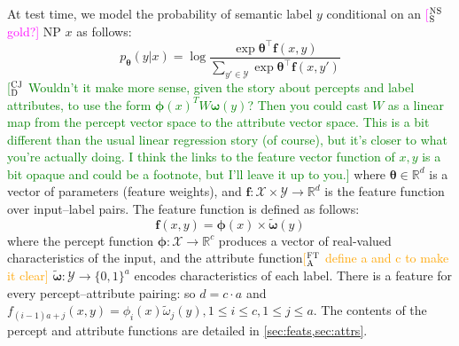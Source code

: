 \documentclass[11pt,letterpaper]{article}
\newcommand{\ensuretext}[1]{#1}
\newcommand{\cjdmarker}{\ensuretext{\textcolor{green}{\ensuremath{^{\textsc{CJ}}_{\textsc{D}}}}}}
\newcommand{\nssmarker}{\ensuretext{\textcolor{magenta}{\ensuremath{^{\textsc{NS}}_{\textsc{S}}}}}}
\newcommand{\ftamarker}{\ensuretext{\textcolor{orange}{\ensuremath{^{\textsc{FT}}_{\textsc{A}}}}}}
\newcommand{\arkcomment}[3]{\ensuretext{\textcolor{#3}{[#1 #2]}}}
\newcommand{\cjd}[1]{\arkcomment{\cjdmarker}{#1}{green}}
\newcommand{\nss}[1]{\arkcomment{\nssmarker}{#1}{magenta}}
\newcommand{\fta}[1]{\arkcomment{\ftamarker}{#1}{orange}}
\begin{document}
At test time, we model the probability of semantic label $y$ 
conditional on an \nss{gold?} NP $x$ as follows:
\begin{equation}
p_{\boldsymbol{\theta}}(y | x) = \log{\frac{\exp{\boldsymbol{\theta}^{\top}\mathbf{f}(x,y)}}{\sum_{y' \in \mathcal{Y}}\exp{\boldsymbol{\theta}^{\top}\mathbf{f}(x,y')}}}
\end{equation}
\cjd{Wouldn't it make more sense, given the story about percepts and label attributes, to use the form $\boldsymbol{\phi}(x)^{T} W \boldsymbol{\omega}(y)$? Then you could cast $W$ as a linear map from the percept vector space to the attribute vector space. This is a bit different than the usual linear regression story (of course), but it's closer to what you're actually doing. I think the links to the feature vector function of $x,y$ is a bit opaque and could be a footnote, but I'll leave it up to you.}
where $\boldsymbol{\theta} \in \mathbb{R}^d$ is a vector of parameters (feature weights), and 
$\mathbf{f}: \mathcal{X} \times \mathcal{Y} \rightarrow \mathbb{R}^d$ is the feature function over input--label pairs.
The feature function is defined as follows:
\begin{equation}
\mathbf{f}(x,y) = \boldsymbol{\phi}(x) \times \tilde{\boldsymbol{\omega}}(y)
\end{equation}
where the percept function $\boldsymbol{\phi}: \mathcal{X} \rightarrow \mathbb{R}^c$ 
produces a vector of real-valued characteristics of the input, and  
the attribute function\fta{define a and c to make it clear} $\tilde{\boldsymbol{\omega}}: \mathcal{Y} \rightarrow \{0,1\}^a$
encodes characteristics of each label.
There is a feature for every percept--attribute pairing: so
$d = c \cdot a$ and $f_{(i-1)a+j}(x,y) = \phi_i(x)\tilde{\omega}_j(y), 1 \leq i \leq c, 1 \leq j \leq a$.
The contents of the percept and attribute functions are detailed in \cref{sec:feats,sec:attrs}.
\end{document}
